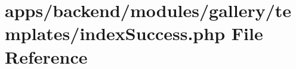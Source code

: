 \hypertarget{backend_2modules_2gallery_2templates_2index_success_8php}{\section{apps/backend/modules/gallery/templates/index\-Success.php File Reference}
\label{backend_2modules_2gallery_2templates_2index_success_8php}
}
